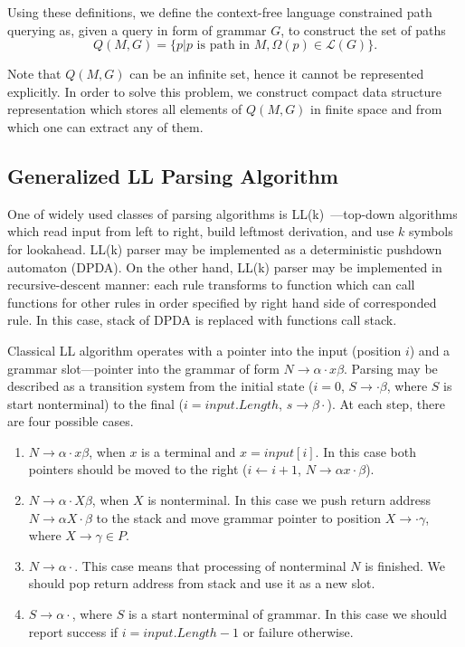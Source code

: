 Using these definitions, we define the context-free language constrained path querying as, given a query in form of grammar $G$, to construct the set of paths $$Q(M,G)=\{p|p \text{ is path in } M, \Omega(p) \in \mathcal{L}(G)\}.$$

Note that $Q(M, G)$ can be an infinite set, hence it cannot be represented explicitly. 
In order to solve this problem, we construct compact data structure representation which stores all elements of $Q(M,G)$ in finite space and from which one can extract any of them.

\subsection{Generalized LL Parsing Algorithm}\label{BasicGLL}

One of widely used classes of parsing algorithms is LL(k)~\cite{Grune}---top-down algorithms which read input from left to right, build leftmost derivation, and use $k$ symbols for lookahead.
LL(k) parser may be implemented as a deterministic pushdown automaton (DPDA).
On the other hand, LL(k) parser may be implemented in recursive-descent manner: each rule transforms to function which can call functions for other rules in order specified by right hand side of corresponded rule.
In this case, stack of DPDA is replaced with functions call stack.

Classical LL algorithm operates with a pointer into the input (position $i$) and a grammar slot---pointer into the grammar of form $N \rightarrow \alpha \cdot x \beta $.
Parsing may be described as a transition system from the initial state ($i = 0$, $S \rightarrow \cdot \beta $, where $S$ is start nonterminal) to the final ($i = input.Length$, $s \rightarrow \beta \cdot$).
At each step, there are four possible cases. 

\begin{enumerate}
\item $N \rightarrow \alpha \cdot x \beta $, when $x$ is a terminal and $x = input[i]$. In this case both pointers should be moved to the right ($i \leftarrow i + 1$, $N \rightarrow \alpha  x \cdot \beta $).
\item $N \rightarrow \alpha \cdot X \beta $, when $X$ is nonterminal. In this case we push return address $N \rightarrow \alpha X \cdot \beta $ to the stack and move grammar pointer to position $X \rightarrow \cdot \gamma$,  where $X \rightarrow \gamma \in P$.\label{itm:2}
\item $N \rightarrow \alpha \cdot $. This case means that processing of nonterminal $N$ is finished. We should pop return address from stack and use it as a new slot.\label{itm:3}
\item $S \rightarrow \alpha \cdot $, where $S$ is a start nonterminal of grammar. In this case we should report success if $i = input.Length - 1$ or failure otherwise. 
\end{enumerate}

